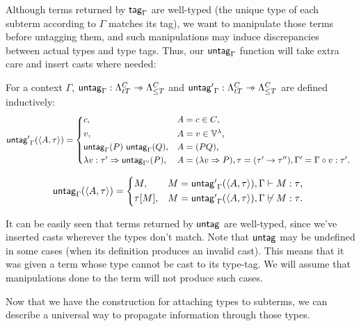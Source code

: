 \documentclass[main.tex]{subfiles}
\begin{document}
Although terms returned by $\mathsf{tag}_{\Gamma}$ are well-typed (the unique type of
each subterm according to $\Gamma$ matches its tag), we want to manipulate
those terms before untagging them, and such manipulations may induce discrepancies
between actual types and type tags. Thus, our $\mathsf{untag}_{\Gamma}$ function
will take extra care and insert casts where needed:
\begin{defn}
    For a context $\Gamma$,
    $\mcf{untag}_{\Gamma} : \ttlambda{T}{C} \pfun \fancylambda{T}{C}$
    and
    $\mcf{untag'}_{\Gamma} : \ttlambda{T}{C} \pfun \fancylambda{T}{C}$
    are defined inductively:
    \[
        \mcf{untag'}_{\Gamma}(\ttt{A}{\tau}) =
        \begin{cases*}
            c ,& $A = c \in C$, \\
            v ,& $A = v \in \lvars$, \\
            \mcf{untag}_{\Gamma}(P) \app \mcf{untag}_{\Gamma}(Q)
 ,& $A = (PQ)$, \\
            \lambda v : \tau' \abstr \mcf{untag}_{\Gamma'}(P)
 ,& $A = (\lambda v \abstr P), \tau = (\tau' \tot \tau'')
                 , \Gamma' = \Gamma \circ v : \tau'$. \\
        \end{cases*}
    \]

    \[
        \mcf{untag}_{\Gamma}(\ttt{A}{\tau}) =
        \begin{cases*}
            M ,& $M = \mcf{untag'}_{\Gamma}(\ttt{A}{\tau}), \Gamma \vdash M : \tau$, \\
            \tau[M] ,& $M = \mcf{untag'}_{\Gamma}(\ttt{A}{\tau}), \Gamma \not\vdash M : \tau$. \\
        \end{cases*}
    \]
\end{defn}

It can be easily seen that terms returned by $\mathsf{untag}$ are well-typed,
since we've inserted casts wherever the types don't match. Note that $\mathsf{untag}$
may be undefined in some cases (when its definition produces an invalid cast).
This means that it was given a term whose type cannot be cast to its type-tag.
We will assume that manipulations done to the term will not produce such cases.

Now that we have the construction for attaching types to subterms, we can
describe a universal way to propagate information through those types.
\end{document}
